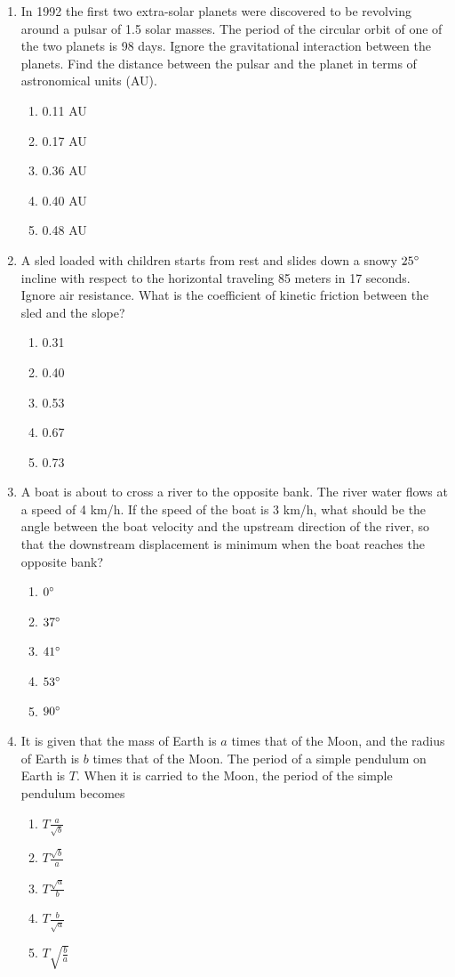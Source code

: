 \documentclass[12pt,letterpaper]{article}
\begin{document}
\begin{enumerate}[resume]
\item
In 1992 the first two extra-solar planets were discovered to be revolving around a pulsar of 1.5 solar masses. The period of the circular orbit of one of the two planets is 98 days. Ignore the gravitational interaction between the planets. Find the distance between the pulsar and the planet in terms of astronomical units (AU).
\begin{enumerate}
\item 0.11 AU
\item 0.17 AU
\item 0.36 AU
\item 0.40 AU
\item 0.48 AU
\end{enumerate}

\item
A sled loaded with children starts from rest and slides down a snowy $25\degree$ incline with respect to the horizontal traveling 85 meters in 17 seconds. Ignore air resistance. What is the coefficient of kinetic friction between the sled and the slope?
\begin{enumerate}
\item 0.31
\item 0.40
\item 0.53
\item 0.67
\item 0.73
\end{enumerate}

\vfill
\newpage

\item
A boat is about to cross a river to the opposite bank. The river water flows at a speed of 4 km/h. If the speed of the boat is 3 km/h, what should be the angle between the boat velocity and the upstream direction of the river, so that the downstream displacement is minimum when the boat reaches the opposite bank?
\begin{enumerate}
\item $0\degree$
\item $37\degree$
\item $41\degree$
\item $53\degree$
\item $90\degree$
\end{enumerate}

\item
It is given that the mass of Earth is $a$ times that of the Moon, and the radius of Earth is $b$ times that of the Moon. The period of a simple pendulum on Earth is $T$. When it is carried to the Moon, the period of the simple pendulum becomes
\begin{enumerate}
\item $\displaystyle T\frac{a}{\sqrt{b}}$
\item $\displaystyle T\frac{\sqrt{b}}{a}$
\item $\displaystyle T\frac{\sqrt{a}}{b}$
\item $\displaystyle T\frac{b}{\sqrt{a}}$
\item $\displaystyle T\sqrt{\frac{b}{a}}$
\end{enumerate}


\end{enumerate}
\end{document}
